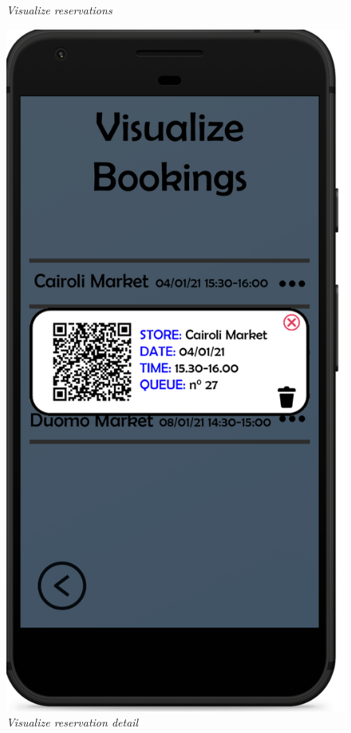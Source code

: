 \documentclass{article}
\begin{document}
\begin{figure}[!h]
\begin{minipage}[!h]{0.4\textwidth}
				\caption{\emph{Visualize reservations}}
			\end{minipage}
			\hfill
			\begin{minipage}[!h]{0.4\textwidth}
				\includegraphics[width=\textwidth]{../Mockups/VBpopup.png}
				\caption{\emph{Visualize reservation detail}}
			\end{minipage}
		\end{figure}
		
\end{document}
